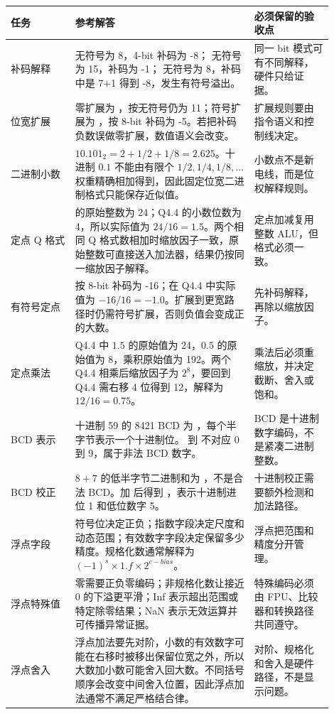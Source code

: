 \begin{longtable}{L{0.18\linewidth}L{0.5\linewidth}L{0.22\linewidth}}
\toprule
任务 & 参考解答 & 必须保留的验收点 \\
\midrule
补码解释 &  无符号为 8，4-bit 补码为 -8； 无符号为 15，补码为 -1； 无符号为 8，补码中是 7+1 得到 -8，发生有符号溢出。 & 同一 bit 模式可有不同解释，硬件只给证据。 \\
位宽扩展 &  零扩展为 ，按无符号仍为 11；符号扩展为 ，按 8-bit 补码为 -5。若把补码负数误做零扩展，数值语义会改变。 & 扩展规则要由指令语义和控制线决定。 \\
二进制小数 & $10.101_2=2+1/2+1/8=2.625$。十进制 $0.1$ 不能由有限个 $1/2,1/4,1/8,\ldots$ 权重精确相加得到，因此固定位宽二进制格式只能保存近似值。 & 小数点不是新电线，而是位权解释规则。 \\
定点 Q 格式 &  的原始整数为 24；Q4.4 的小数位数为 4，所以实际值为 $24/16=1.5$。两个相同 Q 格式数相加时缩放因子一致，原始整数可直接送入加法器，结果仍按同一缩放因子解释。 & 定点加减复用整数 ALU，但格式必须一致。 \\
有符号定点 &  按 8-bit 补码为 -16；在 Q4.4 中实际值为 $-16/16=-1.0$。扩展到更宽路径时仍需符号扩展，否则负值会变成正的大数。 & 先补码解释，再除以缩放因子。 \\
定点乘法 & Q4.4 中 $1.5$ 的原始值为 24，$0.5$ 的原始值为 8，乘积原始值为 192。两个 Q4.4 相乘后缩放因子为 $2^8$，要回到 Q4.4 需右移 4 位得到 12，解释为 $12/16=0.75$。 & 乘法后必须重缩放，并决定截断、舍入或饱和。 \\
BCD 表示 & 十进制 59 的 8421 BCD 为 ，每个半字节表示一个十进制位。 到  不对应 0 到 9，属于非法 BCD 数字。 & BCD 是十进制数字编码，不是紧凑二进制整数。 \\
BCD 校正 & $8+7$ 的低半字节二进制和为 ，不是合法 BCD。加  后得到 ，表示十进制进位 1 和低位数字 5。 & 十进制校正需要额外检测和加法路径。 \\
浮点字段 & 符号位决定正负；指数字段决定尺度和动态范围；有效数字字段决定保留多少精度。规格化数通常解释为 $(-1)^s \times 1.f \times 2^{e-bias}$。 & 浮点把范围和精度分开管理。 \\
浮点特殊值 & 零需要正负零编码；非规格化数让接近 0 的下溢更平滑；Inf 表示超出范围或特定除零结果；NaN 表示无效运算并可传播异常证据。 & 特殊编码必须由 FPU、比较器和转换路径共同遵守。 \\
浮点舍入 & 浮点加法要先对阶，小数的有效数字可能在右移时被移出保留位宽之外，所以大数加小数可能舍入回大数。不同括号顺序会改变中间舍入位置，因此浮点加法通常不满足严格结合律。 & 对阶、规格化和舍入是硬件路径，不是显示问题。 \\

\end{longtable}
